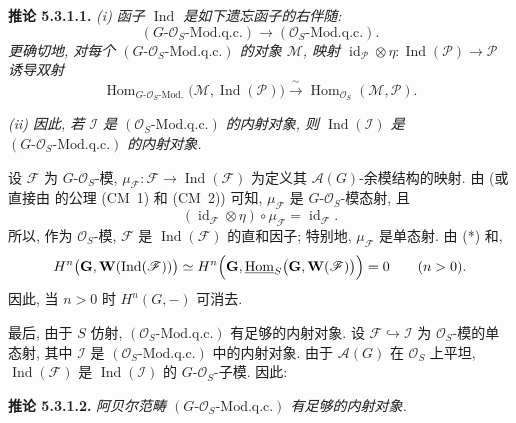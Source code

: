 \medskip
\noindent{}\textbf{推论 5.3.1.1.}
\textit{(i) 函子 \(\operatorname{Ind}\) 是如下遗忘函子的右伴随:}
\[
  (G\text{-}\mathscr O_S\text{-Mod.q.c.})
    \longrightarrow(\mathscr O_S\text{-Mod.q.c.}).
\]
\textit{更确切地, 对每个 \((G\text{-}\mathscr O_S\text{-Mod.q.c.})\) 的对象
\(\mathscr M\), 映射
\(\operatorname{id}_{\mathscr P}\otimes\eta:
  \operatorname{Ind}(\mathscr P)\to\mathscr P\)
诱导双射}
\[
  \operatorname{Hom}_{G\text{-}\mathscr O_S\text{-Mod.}}
    \bigl(\mathscr M,\operatorname{Ind}(\mathscr P)\bigr)
  \xrightarrow{\ \sim\ }
  \operatorname{Hom}_{\mathscr O_S}(\mathscr M,\mathscr P).
\]

\textit{(ii) 因此, 若 \(\mathscr I\) 是
\((\mathscr O_S\text{-Mod.q.c.})\) 的内射对象, 则
\(\operatorname{Ind}(\mathscr I)\) 是
\((G\text{-}\mathscr O_S\text{-Mod.q.c.})\) 的内射对象.}

设 \(\mathscr F\) 为 \(G\)-\(\mathscr O_S\)-模,
\(\mu_{\mathscr F}:\mathscr F\to\operatorname{Ind}(\mathscr F)\) 为定义其
\(\mathscr A(G)\)-余模结构的映射. 由
(或直接由 的公理 (CM~1) 和 (CM~2)) 可知,
\(\mu_{\mathscr F}\) 是 \(G\)-\(\mathscr O_S\)-模态射, 且
\[
  (\operatorname{id}_{\mathscr F}\otimes\eta)\circ\mu_{\mathscr F}
    =\operatorname{id}_{\mathscr F}.
\]
所以, 作为 \(\mathscr O_S\)-模, \(\mathscr F\) 是
\(\operatorname{Ind}(\mathscr F)\) 的直和因子; 特别地,
\(\mu_{\mathscr F}\) 是单态射. 由 (*) 和,
\[
  H^n\bigl(\mathbf G,\mathbf W(\operatorname{Ind}(\mathscr F))\bigr)
    \simeq
  H^n\Bigl(
    \mathbf G,
    \underline{\operatorname{Hom}}_S
      \bigl(\mathbf G,\mathbf W(\mathscr F)\bigr)
  \Bigr)
    =0
  \qquad(n>0).
\]
因此, 当 \(n>0\) 时 \(H^n(G,-)\) 可消去.

最后, 由于 \(S\) 仿射,
\((\mathscr O_S\text{-Mod.q.c.})\) 有足够的内射对象. 设
\(\mathscr F\hookrightarrow\mathscr I\) 为 \(\mathscr O_S\)-模的单态射,
其中 \(\mathscr I\) 是 \((\mathscr O_S\text{-Mod.q.c.})\) 中的内射对象.
由于 \(\mathscr A(G)\) 在 \(\mathscr O_S\) 上平坦,
\(\operatorname{Ind}(\mathscr F)\) 是 \(\operatorname{Ind}(\mathscr I)\) 的
\(G\)-\(\mathscr O_S\)-子模. 因此:

\medskip
\noindent{}\textbf{推论 5.3.1.2.}
\textit{阿贝尔范畴 \((G\text{-}\mathscr O_S\text{-Mod.q.c.})\)
有足够的内射对象.}


